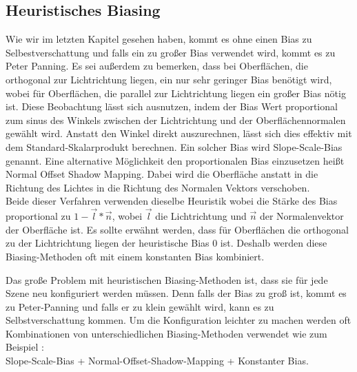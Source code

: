 \subsection{Heuristisches Biasing}
\label{section:heuristic-biasing}
Wie wir im letzten Kapitel gesehen haben, kommt es ohne einen Bias zu Selbestverschattung
und falls ein zu großer Bias verwendet wird, kommt es zu Peter Panning.
Es sei außerdem zu bemerken, dass bei Oberflächen, die orthogonal zur Lichtrichtung liegen, 
ein nur sehr geringer Bias benötigt wird, wobei für Oberflächen, die parallel zur Lichtrichtung 
liegen ein großer Bias nötig ist.
Diese Beobachtung lässt sich ausnutzen, indem der Bias Wert proportional zum sinus des Winkels zwischen
der Lichtrichtung und der Oberflächennormalen gewählt wird.
Anstatt den Winkel direkt auszurechnen, lässt sich dies effektiv mit dem Standard-Skalarprodukt berechnen.
Ein solcher Bias wird Slope-Scale-Bias genannt.
Eine alternative Möglichkeit den proportionalen Bias einzusetzen heißt Normal Offset Shadow Mapping.
Dabei wird die Oberfläche anstatt in die Richtung des Lichtes in die Richtung des Normalen Vektors 
verschoben.
\\
Beide dieser Verfahren verwenden dieselbe Heuristik wobei die Stärke des Bias 
proportional zu $1 - \overrightarrow{l} * \overrightarrow{n}$, wobei $\overrightarrow{l}$ 
die Lichtrichtung und $\overrightarrow{n}$ der Normalenvektor der Oberfläche ist.
Es sollte erwähnt werden, dass für Oberflächen die orthogonal zu der Lichtrichtung liegen
der heuristische Bias 0 ist.
Deshalb werden diese Biasing-Methoden oft mit einem konstanten Bias kombiniert.
\par
Das große Problem mit heuristischen Biasing-Methoden ist, dass 
sie für jede Szene neu konfiguriert werden müssen.
Denn falls der Bias zu groß ist, kommt es zu Peter-Panning und falls er zu klein gewählt 
wird, kann es zu Selbstverschattung kommen.
Um die Konfiguration leichter zu machen werden oft Kombinationen 
von unterschiedlichen Biasing-Methoden verwendet wie zum Beispiel : \\
Slope-Scale-Bias + Normal-Offset-Shadow-Mapping + Konstanter Bias.
